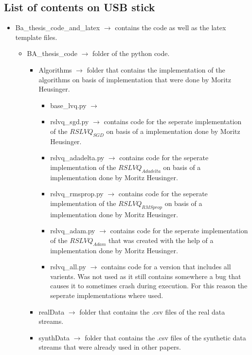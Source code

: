 \documentclass[12pt,oneside,a4paper,parskip]{scrbook}
\begin{document}
\begin{appendices}
      \subsection{List of contents on USB stick}
      \begin{itemize}
        \item Ba\_thesis\_code\_and\_latex $\rightarrow$ contains the code as well as the latex template files.
        \begin{itemize}
          \item BA\_thesis\_code $\rightarrow$ folder of the python code.
          \begin{itemize}
            \item Algorithms $\rightarrow$ folder that contains the implementation of the algorithms on basis of implementation that were done by Moritz Heusinger.
            \begin{itemize}
              \item base\_lvq.py $\rightarrow$
              \item rslvq\_sgd.py $\rightarrow$ contains code for the seperate implementation of the $RSLVQ_\textit{SGD}$
               on basis of a implementation done by Moritz Heusinger.
              \item rslvq\_adadelta.py $\rightarrow$ contains code for the seperate implementation of the $RSLVQ_\textit{Adadelta}$
               on basis of a implementation done by Moritz Heusinger.
              \item rslvq\_rmsprop.py $\rightarrow$ contains code for the seperate implementation of the $RSLVQ_\textit{RMSprop}$ 
              on basis of a implementation done by Moritz Heusinger.
              \item rslvq\_adam.py $\rightarrow$ contains code for the seperate implementation of the $RSLVQ_\textit{Adam}$
               that was created with the help of a implementation done by Moritz Heusinger.
              \item rslvq\_all.py $\rightarrow$ contains code for a version that includes all varients. Was not used as it still contains somewhere a bug that
              causes it to sometimes crash during execution. For this reason the seperate implementations where used.
            \end{itemize}
            \item realData $\rightarrow$ folder that contains the .csv files of the real data streams.
            \item synthData $\rightarrow$ folder that contains the .csv files of the synthetic data streams that were already used in other papers.

\end{itemize}
\end{itemize}
\end{itemize}
\end{appendices}
\end{document}

